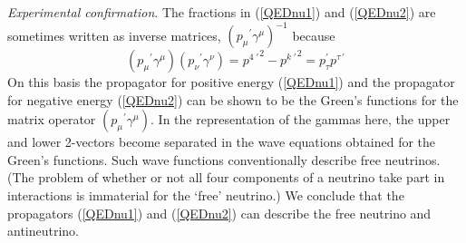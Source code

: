 \documentclass[a4paper,12pt]{article}
\begin{document}
	{\textit{Experimental confirmation}}. The fractions in (\ref{QEDnu1}) and (\ref{QEDnu2}) are sometimes written as inverse matrices, $({p_{\mu}}^{\prime} \gamma^{\mu})^{-1}$ because
\begin{equation}	\label{m-1,again}
({p_{\mu}}^{\prime} \gamma^{\mu})({p_{\nu}}^{\prime} \gamma^{\nu}) = {p^{4 \; \prime}}^{2} - {p^{k \; \prime}}^2  = p_{\tau}^{\prime}p^{\tau \, \prime}
\end{equation}
On this basis the propagator for positive energy (\ref{QEDnu1}) and the propagator for negative energy (\ref{QEDnu2}) can be shown to be the Green's functions for the matrix operator $({p_{\mu}}^{\prime} \gamma^{\mu}).$ In the representation of the gammas here, the upper and lower 2-vectors become separated in the wave equations obtained for the Green's functions. Such wave functions conventionally describe free neutrinos. (The problem of whether or not all four components of a neutrino take part in interactions is immaterial for the `free' neutrino.) We conclude that the propagators (\ref{QEDnu1}) and (\ref{QEDnu2}) can describe the free neutrino and antineutrino.
\end{document}
